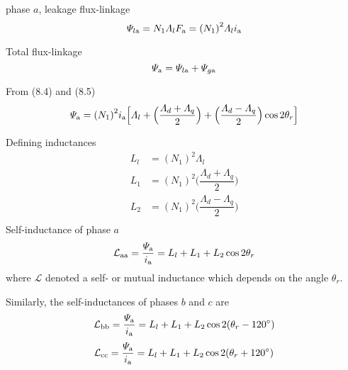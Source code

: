 \documentclass[a4paper,numbers=noenddot,12pt]{scrbook}
\begin{document}
    phase $a$, leakage flux-linkage
    \begin{equation}
        \varPsi_{l\textup{a}} = N_1 \varLambda_l F_{\textup{a}} = {(N_1)}^2 \varLambda_l i_{\textup{a}} 
        \label{eq:Eq8.5}
    \end{equation}

    Total flux-linkage
    \begin{equation}
        \varPsi_{\textup{a}} = \varPsi_{l\textup{a}} + \varPsi_{g\textup{a}}
        \label{eq:Eq8.6}
    \end{equation}

    From (8.4) and (8.5)
    \begin{equation}
        \varPsi_{\textup{a}} = {(N_1)}^2 i_{\textup{a}} \Big[ \varLambda_l + \Big( \dfrac{\varLambda_d + \varLambda_q}{2}\Big) + \Big( \dfrac{\varLambda_d - \varLambda_q}{2}\Big) \cos2\theta_r\Big]
        \label{eq:Eq8.7}
    \end{equation}

    Defining inductances
    \begin{equation}
        \begin{aligned}
            L_l & ={(N_1)}^2 \varLambda_l \\
            L_1 & = {(N_1)}^2 \Big( \dfrac{\varLambda_d + \varLambda_q}{2}\Big) \\
            L_2 & = {(N_1)}^2 \Big( \dfrac{\varLambda_d - \varLambda_q}{2}\Big) \\
        \end{aligned}
        \label{eq:Eq8.8}
    \end{equation}
    Self-inductance of phase $a$
    \begin{equation}
        \mathcal{L}_{\textup{aa}} = \dfrac{\varPsi_{\textup{a}}}{i_{\textup{a}}} = L_l +L_1 +L_2 \cos 2\theta_r
        \label{eq:Eq8.9}
    \end{equation}
    where $\mathcal{L}$ denoted a self- or mutual inductance which depends on the angle $\theta_r$.

    Similarly, the self-inductances of phases $b$ and $c$ are
    \begin{equation}
        \mathcal{L}_{\textup{bb}} = \dfrac{\varPsi_{\textup{a}}}{i_{\textup{a}}} = L_l +L_1 +L_2 \cos 2(\theta_r - 120^{\circ})
        \label{eq:Eq8.10}
    \end{equation}
    \begin{equation}
        \mathcal{L}_{\textup{cc}} = \dfrac{\varPsi_{\textup{a}}}{i_{\textup{a}}} = L_l +L_1 +L_2 \cos 2(\theta_r + 120^{\circ})
        \label{eq:Eq8.11}
    \end{equation}
\end{document}

